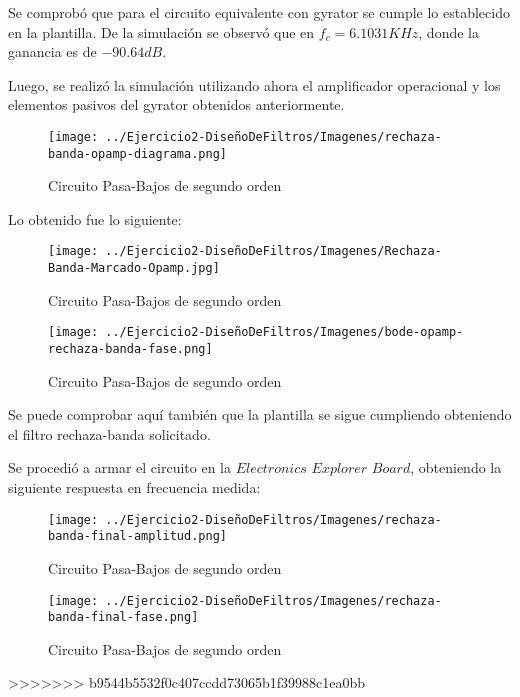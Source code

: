 Se comprobó que para el circuito equivalente con gyrator se cumple lo establecido en la plantilla.
De la simulación se observó que en $f_c=6.1031 KHz$, donde la ganancia es de $-90.64 dB$.

Luego, se realizó la simulación utilizando ahora el amplificador operacional y los elementos pasivos del gyrator obtenidos anteriormente.

\begin{figure}[H]
    \centering
    \texttt{[image: ../Ejercicio2-DiseñoDeFiltros/Imagenes/rechaza-banda-opamp-diagrama.png]}
    \caption{Circuito Pasa-Bajos de segundo orden}
\end{figure}

Lo obtenido fue lo siguiente:

\begin{figure}[H]
    \centering
    \texttt{[image: ../Ejercicio2-DiseñoDeFiltros/Imagenes/Rechaza-Banda-Marcado-Opamp.jpg]}
    \caption{Circuito Pasa-Bajos de segundo orden}
\end{figure}

\begin{figure}[H]
    \centering
    \texttt{[image: ../Ejercicio2-DiseñoDeFiltros/Imagenes/bode-opamp-rechaza-banda-fase.png]}
    \caption{Circuito Pasa-Bajos de segundo orden}
\end{figure}

Se puede comprobar aquí también que la plantilla se sigue cumpliendo obteniendo el filtro rechaza-banda solicitado.

Se procedió a armar el circuito en la $Electronics$ $Explorer$ $Board$, obteniendo la siguiente respuesta en frecuencia medida:

\begin{figure}[H]
    \centering
    \texttt{[image: ../Ejercicio2-DiseñoDeFiltros/Imagenes/rechaza-banda-final-amplitud.png]}
    \caption{Circuito Pasa-Bajos de segundo orden}
\end{figure}

\begin{figure}[H]
    \centering
    \texttt{[image: ../Ejercicio2-DiseñoDeFiltros/Imagenes/rechaza-banda-final-fase.png]}
    \caption{Circuito Pasa-Bajos de segundo orden}
\end{figure}


>>>>>>> b9544b5532f0c407ccdd73065b1f39988c1ea0bb
